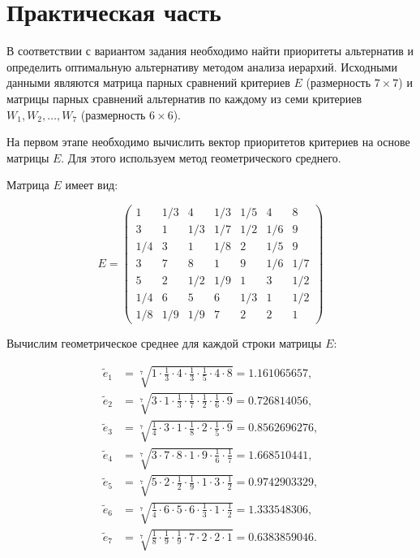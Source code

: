 \clearpage
\section{Практическая часть}

В соответствии с вариантом задания необходимо найти приоритеты альтернатив и определить оптимальную альтернативу методом анализа иерархий. Исходными данными являются матрица парных сравнений критериев $E$ (размерность $7 \times 7$) и матрицы парных сравнений альтернатив по каждому из семи критериев $W_1, W_2, \ldots, W_7$ (размерность $6 \times 6$).


На первом этапе необходимо вычислить вектор приоритетов критериев на основе матрицы $E$. Для этого используем метод геометрического среднего.

Матрица $E$ имеет вид:

\[
E = \begin{pmatrix}
1 & 1/3 & 4 & 1/3 & 1/5 & 4 & 8 \\
3 & 1 & 1/3 & 1/7 & 1/2 & 1/6 & 9 \\
1/4 & 3 & 1 & 1/8 & 2 & 1/5 & 9 \\
3 & 7 & 8 & 1 & 9 & 1/6 & 1/7 \\
5 & 2 & 1/2 & 1/9 & 1 & 3 & 1/2 \\
1/4 & 6 & 5 & 6 & 1/3 & 1 & 1/2 \\
1/8 & 1/9 & 1/9 & 7 & 2 & 2 & 1
\end{pmatrix}
\]

Вычислим геометрическое среднее для каждой строки матрицы $E$:

\begin{align*}
\tilde{e}_1 &= \sqrt[7]{1 \cdot \frac{1}{3} \cdot 4 \cdot \frac{1}{3} \cdot \frac{1}{5} \cdot 4 \cdot 8} = 1.161065657, \\
\tilde{e}_2 &= \sqrt[7]{3 \cdot 1 \cdot \frac{1}{3} \cdot \frac{1}{7} \cdot \frac{1}{2} \cdot \frac{1}{6} \cdot 9} = 0.726814056, \\
\tilde{e}_3 &= \sqrt[7]{\frac{1}{4} \cdot 3 \cdot 1 \cdot \frac{1}{8} \cdot 2 \cdot \frac{1}{5} \cdot 9} = 0.8562696276, \\
\tilde{e}_4 &= \sqrt[7]{3 \cdot 7 \cdot 8 \cdot 1 \cdot 9 \cdot \frac{1}{6} \cdot \frac{1}{7}} = 1.668510441, \\
\tilde{e}_5 &= \sqrt[7]{5 \cdot 2 \cdot \frac{1}{2} \cdot \frac{1}{9} \cdot 1 \cdot 3 \cdot \frac{1}{2}} = 0.9742903329, \\
\tilde{e}_6 &= \sqrt[7]{\frac{1}{4} \cdot 6 \cdot 5 \cdot 6 \cdot \frac{1}{3} \cdot 1 \cdot \frac{1}{2}} = 1.333548306, \\
\tilde{e}_7 &= \sqrt[7]{\frac{1}{8} \cdot \frac{1}{9} \cdot \frac{1}{9} \cdot 7 \cdot 2 \cdot 2 \cdot 1} = 0.6383859046.
\end{align*}

